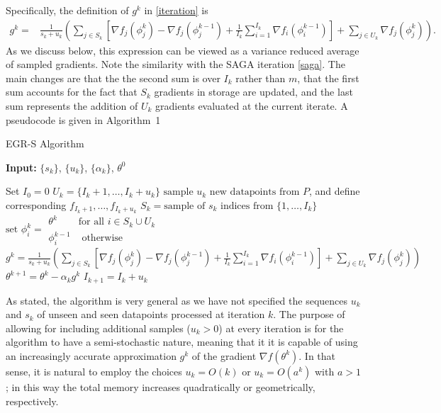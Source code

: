 \documentclass[11pt]{article}
\begin{document}
Specifically, the definition of $g^k$ in \eqref{iteration} is
\begin{align}  \label{gk}
	g^k = & \frac{1}{s_k+u_k} \left(  \sum_{j \in S_k} \left[  \nabla f_j(\phi_j^{k}) -  \nabla f_j(\phi^{k-1}_j) + \frac{1}{I_{k}} \sum_{i = 1}^{I_{k} }  \nabla f_i (\phi_i^{k-1})  \right] + \sum_{j \in U_k}  \nabla f_j(\phi_j^{k})\right). 
\end{align}
As we discuss below, this expression can be viewed as a variance reduced average of sampled gradients. Note the similarity with the SAGA iteration \eqref{saga}. The main changes are that the the second sum is over $I_k$ rather than $m$, that the first sum accounts for the fact that $S_k$ gradients in storage are updated, and the last sum represents the addition of $U_k$ gradients evaluated at the current iterate. A pseudocode is given in Algorithm~1

\bigskip
\begin{algorithm}
	[H] 
	\caption{EGR-S Algorithm}
	\label{alg:egr-s}
	{\bf Input:} $\{ s_k\}$, $\{ u_k \}$, $\{ \alpha_k \}$, $\theta^0$
	\begin{algorithmic}
		[1] 
		\State Set $I_0 = 0$
		\State $U_k =\{I_k+1,\ldots, I_k+u_k \}$ 
		\State $\mbox{sample } u_k \mbox{ new datapoints from } P $, and define corresponding $f_{I_k+1},\ldots, f_{I_k+u_k}$ 
		\State $S_k = \mbox{sample of } s_k \mbox{ indices from }\{ 1, \ldots ,I_k\}$ 
		\State $\mbox{set }\phi_i^k=\begin{array}{ll}
			\theta^k & \mbox{for all $i \in S_k\cup U_k$ } \\
			\phi_i^{k-1} & \mbox{ otherwise} 
		\end{array}$
		\State $g^k =  \frac{1}{s_k+u_k} \left(  \sum_{j \in S_k} \left[  \nabla f_j(\phi_j^{k}) -   \nabla f_j(\phi^{k-1}_j) + \frac{1}{I_{k}} \sum_{i = 1}^{I_{k} }  \nabla f_i (\phi_i^{k-1})  \right] + \sum_{j \in U_k}  \nabla f_j(\phi_j^{k})\right)$ 
		\State $\theta^{k+1} = \theta^k - \alpha_k g^k$ 
		\State $I_{k+1} = I_{k} +u_k$ 
		\EndLoop 
	\end{algorithmic}
\end{algorithm}


As stated, the algorithm is very general as we have not specified the sequences $u_k$ and $s_k$ of unseen and seen datapoints processed at iteration $k$. The purpose of allowing for including additional samples ($u_k >0$) at every iteration is for the algorithm to have a semi-stochastic nature, meaning that it it is capable of using an increasingly accurate approximation $g^k$ of the gradient $\nabla f(\theta^k)$. In that sense, it is natural to employ the choices $u_k = O(k)$ or $u_k= O(a^k)$ with $a>1$; in this way the total memory increases quadratically or geometrically, respectively.
\end{document}
